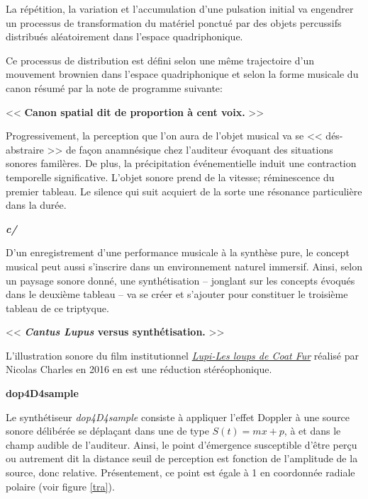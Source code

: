  La r\'{e}p\'{e}tition, la variation et l'accumulation d'une pulsation initial va engendrer un processus de transformation du mat\'{e}riel ponctu\'{e} par des objets percussifs distribu\'{e}s al\'{e}atoirement dans l'espace quadriphonique.
 
Ce processus de distribution est d\'{e}fini selon une m\^eme trajectoire d'un mouvement brownien dans l'espace quadriphonique et selon la forme musicale du canon r\'{e}sum\'{e} par la note de programme suivante:

\bigskip

 << \textbf{Canon spatial dit de proportion \`{a} cent voix.} >>
 
 \bigskip

 Progressivement, la perception que l'on aura de l'objet musical va se << d\'{e}s-abstraire >> de fa\c{c}on anamn\'{e}sique chez l'auditeur \'{e}voquant des situations sonores famil\`{e}res. 
De plus, la pr\'{e}cipitation \'{e}v\'{e}nementielle induit une contraction temporelle significative. L'objet sonore prend de la vitesse; r\'{e}minescence du premier tableau. Le silence qui suit acquiert de la sorte une r\'{e}sonance particuli\`{e}re dans la dur\'{e}e.

\bigskip
\bigskip

 \textbf{\textit{c/}}
 
 D'un enregistrement d'une performance musicale \`{a} la synth\`{e}se pure, le concept musical peut aussi s'inscrire dans un environnement naturel immersif. Ainsi, selon un paysage sonore donn\'{e}, une synth\'{e}tisation -- jonglant sur les concepts \'{e}voqu\'{e}s dans le deuxi\`{e}me tableau -- va se cr\'{e}er et s'ajouter pour constituer le troisi\`{e}me tableau de ce triptyque.     

\bigskip

  << \textbf{\textit{Cantus Lupus} versus synth\'{e}tisation.} >>
  
  \bigskip
  L'illustration sonore du film institutionnel \href{http://refugedesloups.org/video/version\%203\%20refuge\%20des\%20loups.mp4}{\textit{Lupi-Les loups de Coat Fur}} r\'ealis\'e par Nicolas Charles en 2016 en est une r\'eduction st\'er\'eophonique. 
  
  \bigskip
\bigskip
  \bigskip

\noindent \textbf{{\large dop4D4sample}}
\hrulefill

  \bigskip

Le synth\'etiseur  \textsl{dop4D4sample} consiste \`a appliquer l'effet Doppler \`a une source sonore d\'elib\'er\'ee se d\'epla\c{c}ant dans une  de type $S(t)=m x +p$, \`a  et dans le champ audible de l'auditeur. Ainsi, le point d'\'emergence susceptible d'\^etre per\c{c}u ou autrement dit la distance seuil de perception est fonction de l'amplitude de la source, donc relative. Pr\'esentement, ce point est \'egale \`a 1 en coordonn\'ee radiale polaire (voir figure \ref{tra}). 

